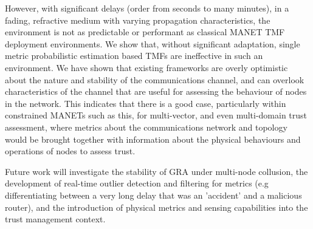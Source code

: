 \documentclass[conference]{IEEEtran}
\begin{document}
However, with significant delays (order from seconds to many minutes), in a fading, refractive medium with varying propagation characteristics, the environment is not as predictable or performant as classical MANET TMF deployment environments.
We show that, without significant adaptation, single metric probabilistic estimation based TMFs are ineffective in such an environment.
We have shown that existing frameworks are overly optimistic about the nature and stability of the communications channel, and can overlook characteristics of the channel that are useful for assessing the behaviour of nodes in the network. 
This indicates that there is a good case, particularly within constrained MANETs such as this, for multi-vector, and even multi-domain trust assessment, where metrics about the communications network and topology would be brought together with information about the physical behaviours and operations of nodes to assess trust.

Future work will investigate the stability of GRA under multi-node collusion, the development of real-time outlier detection and filtering for metrics (e.g differentiating between a very long delay that was an 'accident' and a malicious router), and the introduction of physical metrics and sensing capabilities into the trust management context.


%
%

\end{document}
